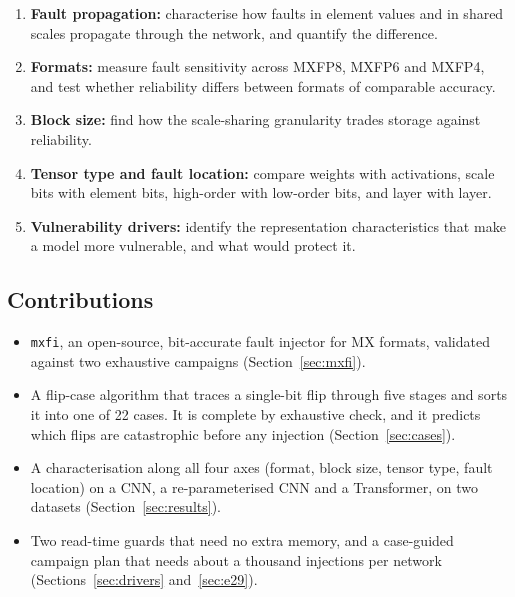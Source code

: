 \documentclass[12pt,a4paper]{article}
\begin{document}
\begin{enumerate}[label=\textbf{O\arabic*}]
    \item \textbf{Fault propagation:} characterise how faults in element values and in shared
          scales propagate through the network, and quantify the difference.
    \item \textbf{Formats:} measure fault sensitivity across MXFP8, MXFP6 and MXFP4, and test
          whether reliability differs between formats of comparable accuracy.
    \item \textbf{Block size:} find how the scale-sharing granularity trades storage against
          reliability.
    \item \textbf{Tensor type and fault location:} compare weights with activations, scale bits
          with element bits, high-order with low-order bits, and layer with layer.
    \item \textbf{Vulnerability drivers:} identify the representation characteristics that make
          a model more vulnerable, and what would protect it.
\end{enumerate}

\subsection{Contributions}

\begin{itemize}
    \item \texttt{mxfi}, an open-source, bit-accurate fault injector for MX formats, validated
          against two exhaustive campaigns (Section~\ref{sec:mxfi}).
    \item A flip-case algorithm that traces a single-bit flip through five stages and sorts it
          into one of 22 cases. It is complete by exhaustive check, and it predicts which flips
          are catastrophic before any injection (Section~\ref{sec:cases}).
    \item A characterisation along all four axes (format, block size, tensor type, fault
          location) on a CNN, a re-parameterised CNN and a Transformer, on two datasets
          (Section~\ref{sec:results}).
    \item Two read-time guards that need no extra memory, and a case-guided campaign plan that
          needs about a thousand injections per network (Sections~\ref{sec:drivers}
          and~\ref{sec:e29}).
\end{itemize}

\end{document}
